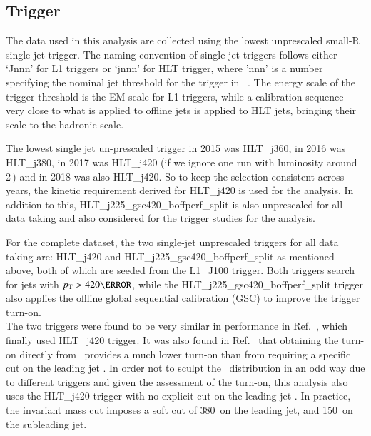 \subsection{Trigger}
The data used in this analysis are collected using the lowest
unprescaled small-R single-jet trigger.  The naming convention of
single-jet triggers follows either `Jnnn' for L1 triggers or `jnnn' for
HLT trigger, where 'nnn' is a number specifying the nominal jet \pT
threshold for the trigger in \GeV\ .  The energy scale of the trigger
threshold is the EM scale for L1 triggers, while a calibration sequence
very close to what is applied to offline jets is applied to HLT jets,
bringing their scale to the hadronic scale.

The lowest single jet un-prescaled trigger in 2015 was HLT\_j360, in
2016 was HLT\_j380, in 2017 was HLT\_j420 (if we ignore one run with
luminosity around 2\,\ipb ) and in 2018 was also HLT\_j420. So to keep
the selection consistent across years, the kinetic requirement derived
for HLT\_j420 is used for the analysis. In addition to this,
HLT\_j225\_gsc420\_boffperf\_split is also unprescaled for all data
taking and also considered for the trigger studies for the analysis.

For the complete \RunTwo dataset, the two single-jet unprescaled
triggers for all data taking are: HLT\_j420 and
HLT\_j225\_gsc420\_boffperf\_split as mentioned above, both of which are
seeded from the L1\_J100 trigger. Both triggers search for jets with
$\pT > 420 \GeV$, while the HLT\_j225\_gsc420\_boffperf\_split trigger
also applies the offline global sequential calibration (GSC) to improve
the trigger turn-on.\\

The two triggers were found to be very similar in
performance in Ref.~\cite{Nishu:2646455}, which finally used HLT\_j420 trigger.
It was also found in Ref.~\cite{Nishu:2646455} that obtaining the turn-on directly from \mjj\ provides a much
lower turn-on than from requiring a specific cut on the leading jet \pT.
In order not to sculpt the \mjj\ distribution in an odd way due to
different triggers and given the assessment of the turn-on, this analysis also
uses the HLT\_j420 trigger with no explicit cut on the leading jet \pT.
In practice, the invariant mass cut imposes a soft cut of 380~\GeV on 
the leading jet, and 150~\GeV on the subleading jet. 

